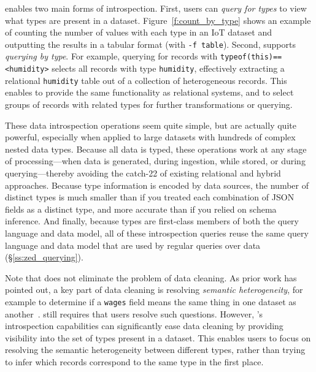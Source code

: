 \sys{} enables two main forms of introspection. First, users can {\em query for types} to view what types are present in a dataset. Figure~\ref{f:count_by_type} shows an example of counting the number of values with each type in an IoT dataset and outputting the results in a tabular format (with \texttt{-f table}). Second, \sys{} supports {\em querying by type}. For example, querying for records with \texttt{typeof(this)==<humidity>} selects all records with type \texttt{humidity}, effectively extracting a relational \texttt{humidity} table out of a collection of heterogeneous records.
This enables \sys{} to provide the same functionality as relational systems, and to select groups of records with related types for further transformations or querying.

These data introspection operations seem quite simple, but are actually quite powerful, especially when applied to large datasets with hundreds of complex nested data types. Because all \sys{} data is typed, these operations work at any stage of processing---when data is generated, during ingestion, while stored, or during querying---thereby avoiding the catch-22 of existing relational and hybrid approaches. Because type information is encoded by data sources, the number of distinct types is much smaller than if you treated each combination of JSON fields as a distinct type, and more accurate than if you relied on schema inference. And finally, because types are first-class members of both the query language and data model, all of these introspection queries reuse the same query language and data model that are used by regular queries over data (\S\ref{ss:zed_querying}).

Note that \sys{} does not eliminate the problem of data cleaning. As prior work has pointed out, a key part of data cleaning is resolving {\em semantic heterogeneity}, for example to determine if a \texttt{wages} field means the same thing in one dataset as another~. \sys{} still requires that users resolve such questions. However, \sys{}'s introspection capabilities can significantly ease data cleaning by providing visibility into the set of types present in a dataset. This enables users to focus on resolving the semantic heterogeneity between different types, rather than trying to infer which records correspond to the same type in the first place.




